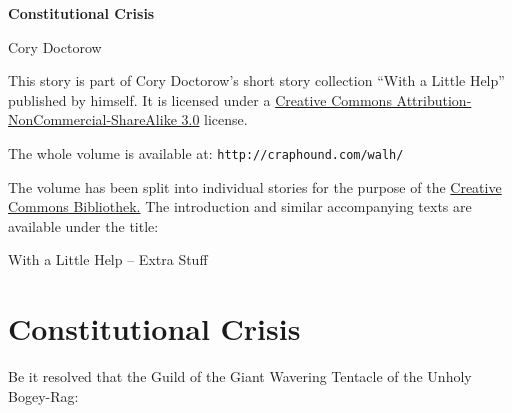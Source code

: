 

\newcommand\strangesymbol{\ensuremath{\neg}}


\raggedbottom

\begin{center}
\textbf{\huge\textsf{Constitutional Crisis}}

\medskip
Cory Doctorow

\end{center}

\bigskip

\begin{flushleft}
This story is part of Cory Doctorow’s short story collection
“With a Little Help” published by himself. It is licensed under a
\href{http://creativecommons.org/licenses/by-nc-sa/}
{Creative Commons Attribution-NonCommercial-ShareAlike 3.0} license.

\bigskip

The whole volume is available at:
\texttt{http://craphound.com/walh/}

\medskip

The volume has been split into individual stories for the purpose of the
\href{http://ccbib.org}{Creative Commons Bibliothek.}
The introduction and similar accompanying texts are available under the 
title:
\end{flushleft}
\begin{center}
With a Little Help -- Extra Stuff
\end{center}

\newpage

\setlength{\parindent}{0pt}
\setlength{\parskip}{0.5\baselineskip}

\section{Constitutional Crisis}

Be it resolved that the Guild of the Giant Wavering Tentacle of the 
Unholy Bogey-Rag:

